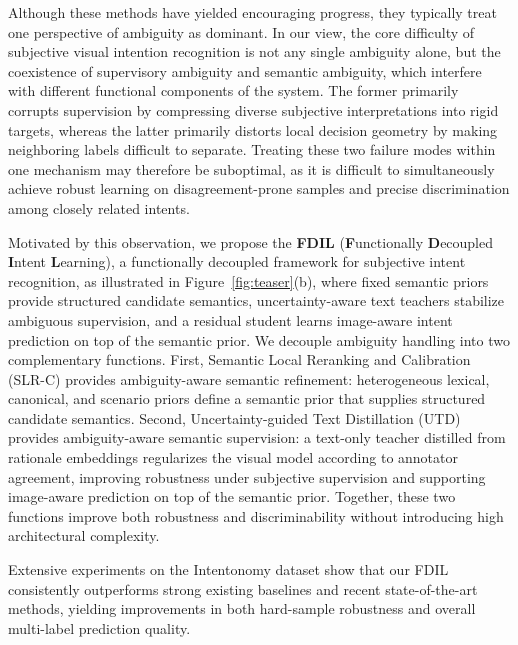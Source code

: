 Although these methods have yielded encouraging progress, they typically treat one perspective of ambiguity as dominant. 
In our view, the core difficulty of subjective visual intention recognition is not any single ambiguity alone, but the coexistence of supervisory ambiguity and semantic ambiguity, which interfere with different functional components of the system. 
The former primarily corrupts supervision by compressing diverse subjective interpretations into rigid targets, whereas the latter primarily distorts local decision geometry by making neighboring labels difficult to separate. 
Treating these two failure modes within one mechanism may therefore be suboptimal, as it is difficult to simultaneously achieve robust learning on disagreement-prone samples and precise discrimination among closely related intents.

Motivated by this observation, we propose the \textbf{FDIL} (\textbf{F}unctionally \textbf{D}ecoupled \textbf{I}ntent \textbf{L}earning), a functionally decoupled framework for subjective intent recognition, as illustrated in Figure~\ref{fig:teaser}(b), where fixed semantic priors provide structured candidate semantics, uncertainty-aware text teachers stabilize ambiguous supervision, and a residual student learns image-aware intent prediction on top of the semantic prior.
We decouple ambiguity handling into two complementary functions.
First, Semantic Local Reranking and Calibration (SLR-C) provides ambiguity-aware semantic refinement: heterogeneous lexical, canonical, and scenario priors define a semantic prior that supplies structured candidate semantics.
Second, Uncertainty-guided Text Distillation (UTD) provides ambiguity-aware semantic supervision: a text-only teacher distilled from rationale embeddings regularizes the visual model according to annotator agreement, improving robustness under subjective supervision and supporting image-aware prediction on top of the semantic prior.
Together, these two functions improve both robustness and discriminability without introducing high architectural complexity.

Extensive experiments on the Intentonomy dataset show that our FDIL consistently outperforms strong existing baselines and recent state-of-the-art methods, yielding improvements in both hard-sample robustness and overall multi-label prediction quality.

